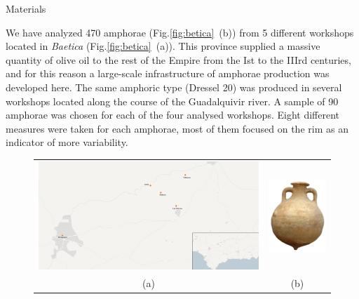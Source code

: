 \documentclass[final]{beamer}
\newcommand{\memo}[2]{\textcolor{#1}{#2}}
\newcommand{\xavi}[1]{\memo{orange}{#1\\}}
\newlength{\onecolwid}
\begin{document}
\begin{frame}[t]
\begin{columns}[t]
\begin{column}{\onecolwid}
\begin{block}{Materials}

\justify
We have analyzed 470 amphorae (Fig.\ref{fig:betica}~(b)) from 5 different workshops located in \emph{Baetica} (Fig.\ref{fig:betica}~(a)). This province supplied a massive quantity of olive oil to the rest of the Empire from the Ist to the IIIrd centuries, and for this reason a large-scale infrastructure of amphorae production was developed here. The same amphoric type (Dressel 20) was produced in several workshops located along the course of the Guadalquivir river. A sample of 90 amphorae was chosen for each of the four analysed workshops. Eight different measures were taken for each amphorae, most of them focused on the rim as an indicator of more variability. 



\begin{figure}
\begin{tabular}{cc}


\includegraphics[width=0.7\linewidth]{images/fig1.png} &
\includegraphics[width=0.2\linewidth]{images/amphorae.png} \\
(a) & (b)
\end{tabular}


\end{figure}
\end{block}
\end{column}
\end{columns}
\end{frame}
\end{document}
